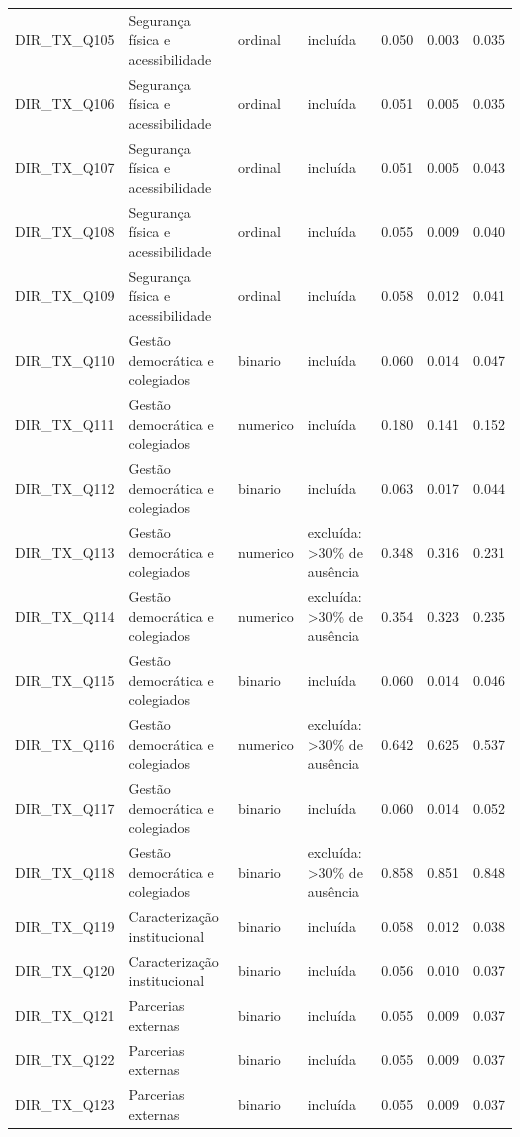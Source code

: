 \begin{tabular}{llllrrr}
DIR\_TX\_Q105 & Segurança física e acessibilidade & ordinal & incluída & 0.050 & 0.003 & 0.035 \\
DIR\_TX\_Q106 & Segurança física e acessibilidade & ordinal & incluída & 0.051 & 0.005 & 0.035 \\
DIR\_TX\_Q107 & Segurança física e acessibilidade & ordinal & incluída & 0.051 & 0.005 & 0.043 \\
DIR\_TX\_Q108 & Segurança física e acessibilidade & ordinal & incluída & 0.055 & 0.009 & 0.040 \\
DIR\_TX\_Q109 & Segurança física e acessibilidade & ordinal & incluída & 0.058 & 0.012 & 0.041 \\
DIR\_TX\_Q110 & Gestão democrática e colegiados & binario & incluída & 0.060 & 0.014 & 0.047 \\
DIR\_TX\_Q111 & Gestão democrática e colegiados & numerico & incluída & 0.180 & 0.141 & 0.152 \\
DIR\_TX\_Q112 & Gestão democrática e colegiados & binario & incluída & 0.063 & 0.017 & 0.044 \\
DIR\_TX\_Q113 & Gestão democrática e colegiados & numerico & excluída: >30\% de ausência & 0.348 & 0.316 & 0.231 \\
DIR\_TX\_Q114 & Gestão democrática e colegiados & numerico & excluída: >30\% de ausência & 0.354 & 0.323 & 0.235 \\
DIR\_TX\_Q115 & Gestão democrática e colegiados & binario & incluída & 0.060 & 0.014 & 0.046 \\
DIR\_TX\_Q116 & Gestão democrática e colegiados & numerico & excluída: >30\% de ausência & 0.642 & 0.625 & 0.537 \\
DIR\_TX\_Q117 & Gestão democrática e colegiados & binario & incluída & 0.060 & 0.014 & 0.052 \\
DIR\_TX\_Q118 & Gestão democrática e colegiados & binario & excluída: >30\% de ausência & 0.858 & 0.851 & 0.848 \\
DIR\_TX\_Q119 & Caracterização institucional & binario & incluída & 0.058 & 0.012 & 0.038 \\
DIR\_TX\_Q120 & Caracterização institucional & binario & incluída & 0.056 & 0.010 & 0.037 \\
DIR\_TX\_Q121 & Parcerias externas & binario & incluída & 0.055 & 0.009 & 0.037 \\
DIR\_TX\_Q122 & Parcerias externas & binario & incluída & 0.055 & 0.009 & 0.037 \\
DIR\_TX\_Q123 & Parcerias externas & binario & incluída & 0.055 & 0.009 & 0.037 \\

\end{tabular}
